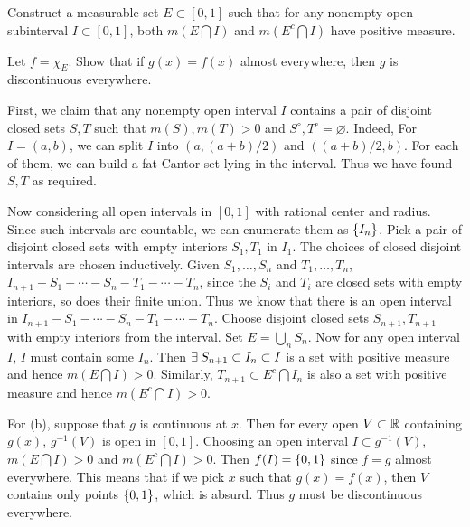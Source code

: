\begin{exercise}
    \begin{thmenum}
        \item Construct a measurable set $E\subset [0,1]$ such 
        that for any nonempty open subinterval $I\subset [0,1]$, 
        both $m(E\bigcap I)$ and $m(E^c\bigcap I)$ have positive
        measure. 
        \item Let $f=\chi_E$. Show that if $g(x)=f(x)$ almost 
        everywhere, then $g$ is discontinuous everywhere.
    \end{thmenum}
\end{exercise}
\begin{pf}
    First, we claim that any nonempty open interval $I$ contains 
    a pair of disjoint closed sets $S,T$ such that 
    $m(S),m(T)>0$ and $S^\circ,T^\circ = \varnothing$. Indeed, 
    For $I=(a,b)$, we can split $I$ into $(a,(a+b)/2)$ and 
    $((a+b)/2,b)$. For each of them, we can build a fat Cantor 
    set lying in the interval. Thus we have found $S,T$ as 
    required.
    
    Now considering all open intervals in $[0,1]$ with 
    rational center and radius. Since such intervals are 
    countable, we can enumerate them as $\left\{ {I_n} \right\}$. Pick 
    a pair of disjoint closed sets with empty interiors 
    $S_1,T_1$ in $I_1$. The choices of closed disjoint 
    intervals are chosen inductively. Given $S_1,\ldots,S_n$ 
    and $T_1,\ldots,T_n$, $I_{n+1}-S_1-\cdots-S_n-T_1-\cdots
    -T_n$, since the $S_i$ and $T_i$ are closed sets with 
    empty interiors, so does their finite union. Thus we know 
    that there is an open interval in $I_{n+1}-S_1-\cdots-S_n
    -T_1-\cdots-T_n$. Choose disjoint closed sets $S_{n+1},
    T_{n+1}$ with empty interiors from the interval. Set 
    $E = \bigcup_n S_n$. Now for any open interval $I$, $I$ 
    must contain some $I_n$. Then $\exists\: S_{n+1}\subset 
    I_n\subset I$ is a set with positive measure and hence 
    $m(E\bigcap I)>0$. Similarly, $T_{n+1}\subset E^c\bigcap 
    I_n$ is also a set with positive measure and hence 
    $m(E^c\bigcap I)>0$.
    
    For (b), suppose that $g$ is continuous at $x$. Then for 
    every open $V\subset\mathbb{R}$ containing $g(x)$, $g^{-1}(V)$ is 
    open in $[0,1]$. Choosing an open interval $I\subset 
    g^{-1}(V)$, $m(E\bigcap I)>0$ and $m(E^c\bigcap I)>0$. 
    Then $f(I)=\left\{ {0,1} \right\}$ since $f=g$ almost everywhere. This 
    means that if we pick $x$ such that $g(x)=f(x)$, then 
    $V$ contains only points $\left\{ {0,1} \right\}$, which is absurd. 
    Thus $g$ must be discontinuous everywhere.
\end{pf}

